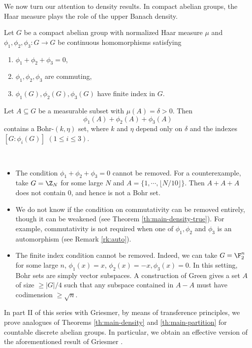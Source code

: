 We now turn our attention to density results. In compact abelian groups, the Haar measure plays the role of the upper Banach density.  

\begin{theorem} \label{th:main-density}
Let $G$ be a compact abelian group with normalized Haar measure $\mu$ and $\phi_1, \phi_2, \phi_3: G \rightarrow G$ be continuous homomorphisms satisfying
\begin{enumerate}[label=(\alph*), leftmargin=*]
\item $\phi_1 + \phi_2 + \phi_3 = 0$,
\item $\phi_1, \phi_2, \phi_3$ are commuting,
\item $\phi_1(G), \phi_2(G), \phi_3(G)$ have finite index in $G$.
\end{enumerate} 
Let $A \subseteq G$ be a measurable subset with $\mu(A) = \delta >0$. Then 
\[
\phi_1(A) + \phi_2(A) + \phi_3(A)
\] contains a Bohr-$(k, \eta)$ set, where $k$ and $\eta$ depend only on $\delta$ and the indexes $[G:\phi_i(G)]$ $(1 \leq i \leq 3)$.
\end{theorem}

\begin{remark}\label{remark:density_commutative}\
\begin{itemize}[leftmargin=*]
\item The condition $\phi_1 + \phi_2 + \phi_3 = 0$ cannot be removed. For a counterexample, take $G=\Z_N$ for some large $N$ and $A = \{1, \cdots, \lfloor N/10 \rfloor\}$. Then $A+A+A$ does not contain 0, and hence is not a Bohr set.
\item We do not know if the condition on commutativity can be removed entirely, though it can be weakened (see Theorem \ref{th:main-density-true}). For example, commutativity is not required when one of $\phi_1, \phi_2$ and $\phi_3$ is an automorphism (see Remark \ref{rk:auto}).
\item The finite index condition cannot be removed. Indeed, we can take $G = \F_2^n$ for some large $n$, $\phi_1(x)= x$, $\phi_2(x)=-x, \phi_3(x)=0$. In this setting, Bohr sets are simply vector subspaces. A construction of Green \cite[Theorem 9.4]{green-ff} gives a set $A$ of size $\geq |G|/4$ such that any subspace contained in $A-A$ must have codimension $\geq \sqrt{n}$.  
\end{itemize}
\end{remark}

In part II of this series \cite{Griesmer-Le-Le-countable} with Griesmer, by means of transference principles, we prove analogues of Theorems \ref{th:main-density} and \ref{th:main-partition} for countable discrete abelian groups. 
In particular, we obtain an effective version of the aforementioned result of Griesmer \cite{griesmer-br}. %

